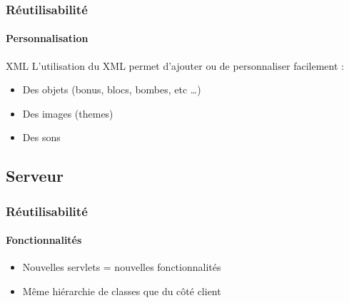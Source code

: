 	\begin{frame}
	\frametitle{Réutilisabilité}
	\framesubtitle{Personnalisation}
	
		XML
			L'utilisation du XML permet d'ajouter ou de personnaliser facilement :
			\begin{itemize}
				\item Des objets (bonus, blocs, bombes, etc \ldots)
				\item Des images (themes)
				\item Des sons
			\end{itemize}
	\end{frame}
	

\subsection{Serveur}

	\begin{frame}
	\frametitle{Réutilisabilité}
	\framesubtitle{Fonctionnalités}
	
		\begin{itemize}
			\item Nouvelles servlets = nouvelles fonctionnalités
			\item Même hiérarchie de classes que du côté client 
		\end{itemize}
		
	\end{frame}